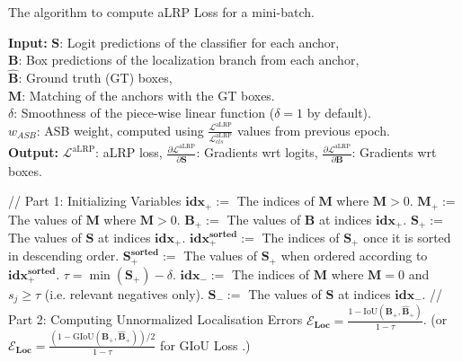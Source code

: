 \documentclass{article}
\begin{document}
\begin{algorithm}
\caption{The algorithm to compute aLRP Loss for a mini-batch. \label{alg:aLRPLoss}}
\begin{flushleft}
\hspace*{\algorithmicindent} \textbf{Input:} $\mathbf{S}$: Logit predictions of the classifier for each anchor, \\ 
\hspace*{15mm} $\mathbf{B}$: Box predictions of the localization branch from each anchor,\\
\hspace*{15mm} $\mathbf{\hat{B}}$: Ground truth (GT) boxes, \\
\hspace*{15mm} $\mathbf{M}$: Matching of the anchors with the GT boxes. \\
\hspace*{15mm} $\delta$: Smoothness of the piece-wise linear function ($\delta=1$ by default). \\
\hspace*{15mm} $w_{ASB}$: ASB weight, computed using $\frac{\mathcal{L}^\mathrm{aLRP}}{\mathcal{L}^\mathrm{aLRP}_{cls}}$ values from previous epoch. \\
 \hspace*{\algorithmicindent} \textbf{Output:} $\mathcal{L}^\mathrm{aLRP}$: aLRP loss, $\frac{\partial \mathcal{L}^\mathrm{aLRP}}{ \partial \mathbf{S}}$: Gradients wrt logits, $\frac{\partial \mathcal{L}^\mathrm{aLRP}}{ \partial \mathbf{B}}$: Gradients wrt boxes.
\end{flushleft}
\begin{algorithmic}[1]
\State // Part 1: Initializing Variables
\State $\mathbf{idx}_+ :=$ The indices of $\mathbf{M}$ where $\mathbf{M} > 0$.
\State $\mathbf{M}_+ :=$ The values of $\mathbf{M}$ where $\mathbf{M} > 0$.
\State $\mathbf{B_+}:=$ The values of $\mathbf{B}$ at indices $\mathbf{idx}_+$.
\State $\mathbf{S_+}:=$ The values of $\mathbf{S}$ at indices $\mathbf{idx}_+$.
\State $\mathbf{idx^{sorted}_+} :=$ The indices of $\mathbf{S_+}$ once it is sorted in descending order.
\State $\mathbf{S^{sorted}_+} :=$ The values of $\mathbf{S_+}$ when ordered according to $\mathbf{idx^{sorted}_+}$.
\State $\tau=\min (\mathbf{S_+})-\delta$.
\State $\mathbf{idx}_- :=$ The indices of $\mathbf{M}$ where $\mathbf{M} = 0$ and $s_j \geq \tau$ (i.e. relevant negatives only).
\State $\mathbf{S_-}:=$ The values of $\mathbf{S}$ at indices $\mathbf{idx}_-$.
\State // Part 2: Computing Unnormalized Localisation Errors
\State $\mathbf{\mathcal{E}_{Loc}} = \frac{1-\mathrm{IoU}(\mathbf{B_+}, \mathbf{\hat{B}_+})}{1-\tau}$. (or $\mathbf{\mathcal{E}_{Loc}} = \frac{(1-\mathrm{GIoU}(\mathbf{B_+}, \mathbf{\hat{B}_+}))/2}{1-\tau}$ for $\mathrm{GIoU}$ Loss \cite{GIoULoss}.)

\end{algorithmic}
\end{algorithm}
\end{document}
